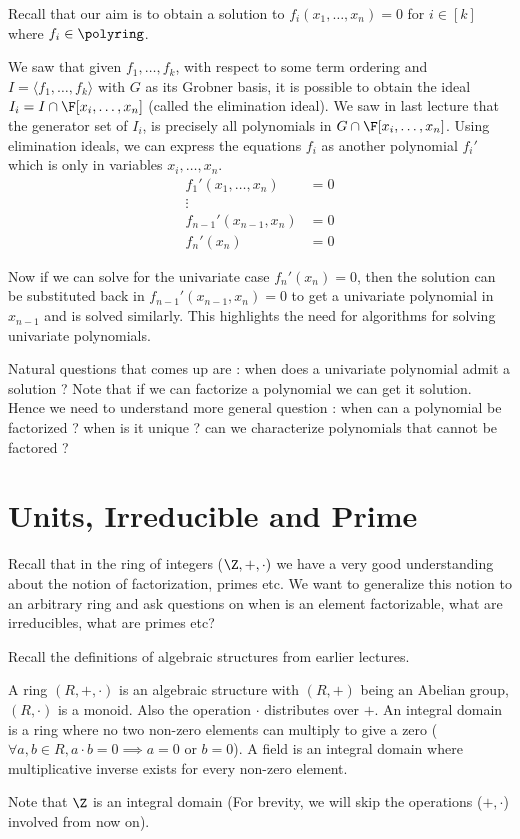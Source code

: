 
Recall that our aim is to obtain a solution to $f_i(x_1,\ldots,x_n) = 0$ for
$i \in [k]$ where $f_i \in \polyring$.

We saw that given $f_1,\ldots,f_k$, with respect to some term ordering and $I
= \langle f_1,\ldots,f_k \rangle$ with $G$ as its Grobner basis,  
it is possible to obtain the ideal $I_i = I \cap \F[x_i,\ldots, x_n]$ 
(called the elimination ideal). We saw in last lecture that the 
generator set of $I_i$, is precisely all polynomials in $G \cap
\F[x_i,\ldots, x_n]$. Using elimination ideals, we can express the equations
$f_i$ as another polynomial $f_i'$ which is only in variables $x_i,
\ldots,x_n$. 
\begin{align*}
	f_1'(x_1,\ldots,x_n) & = 0 \\
	\vdots \\
	f_{n-1}'(x_{n-1},x_n)  & = 0 \\
	f_n'(x_n) & = 0
\end{align*}

Now if we can solve for the univariate case $f_n'(x_n) = 0$, then the solution 
can be substituted back in $f_{n-1}'(x_{n-1},x_n) = 0$ to get a univariate 
polynomial in $x_{n-1}$ and is solved similarly. This highlights the
need for algorithms for solving univariate polynomials.

Natural questions that comes up are : when does a univariate polynomial admit
a solution ? Note that if we can factorize a polynomial we can get it
solution. Hence we need to understand more general question : when can a
polynomial be factorized ? when is it unique ? can we characterize
polynomials that cannot be factored ?

\section{Units, Irreducible and Prime}
Recall that in the ring of integers ($\Z,+, \cdot)$ we have a very
good understanding about the notion of factorization, primes etc.
We want to generalize this notion to an arbitrary ring and ask
questions on when is an element factorizable, what are irreducibles,
what are primes etc?

Recall the definitions of algebraic structures from earlier lectures. 
\begin{definition}
	A ring $(R,+,\cdot)$ is an algebraic structure with $(R,+)$ being an
	Abelian group, $(R,\cdot)$ is a monoid. Also the operation $\cdot$
	distributes over $+$.  An integral domain is a ring where no two
	non-zero elements can multiply to give a zero ($\forall a, b \in R,
	a\cdot b = 0 \implies a =0 \text{ or } b = 0$).  A field is an
	integral domain where multiplicative inverse exists for every non-zero
	element.
\end{definition}
Note that $\Z$ is an integral domain (For brevity, we will skip the 
operations ($+, \cdot$) involved from now on).

